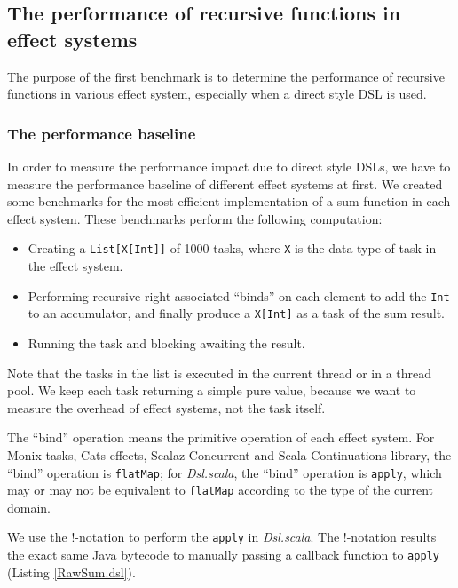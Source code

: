 \subsection{The performance of recursive functions in effect systems}

The purpose of the first benchmark is to determine the performance of recursive functions in various effect system, especially when a direct style DSL is used.

\subsubsection{The performance baseline}

In order to measure the performance impact due to direct style DSLs, we have to measure the performance baseline of different effect systems at first. We created some benchmarks for the most efficient implementation of a sum function in each effect system. These benchmarks perform the following computation:

\begin{itemize}
  \item Creating a \lstinline{List[X[Int]]} of 1000 tasks, where \lstinline{X} is the data type of task in the effect system.
  \item Performing recursive right-associated ``binds'' on each element to add the \lstinline{Int} to an accumulator, and finally produce a \lstinline{X[Int]} as a task of the sum result.
  \item Running the task and blocking awaiting the result.
\end{itemize}

Note that the tasks in the list is executed in the current thread or in a thread pool. We keep each task returning a simple pure value, because we want to measure the overhead of effect systems, not the task itself.

The ``bind'' operation means the primitive operation of each effect system. For Monix tasks, Cats effects, Scalaz Concurrent and Scala Continuations library, the ``bind'' operation is \lstinline{flatMap}; for \textit{Dsl.scala}, the ``bind'' operation is \lstinline{apply}, which may or may not be equivalent to \lstinline{flatMap} according to the type of the current domain.

We use the !-notation to perform the \lstinline{apply} in \textit{Dsl.scala}. The !-notation results the exact same Java bytecode to manually passing a callback function to \lstinline{apply} (Listing \ref{RawSum.dsl}).

